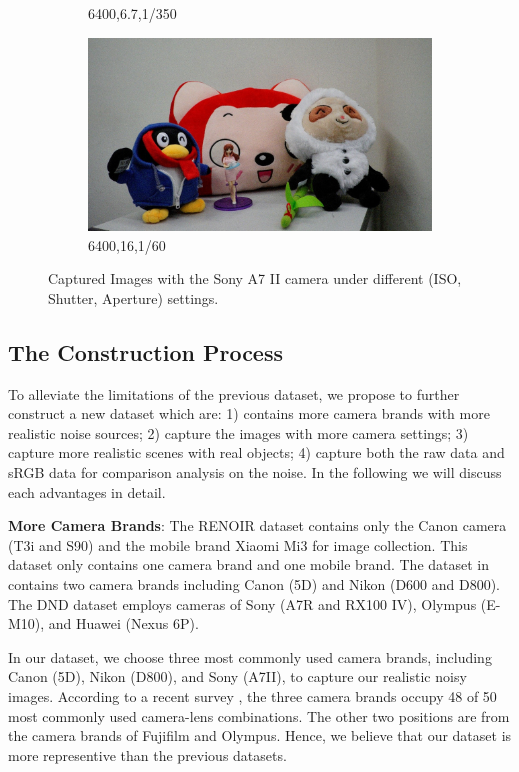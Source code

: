 \begin{figure}
\begin{subfigure}[t]{0.32\textwidth}
		\caption{6400,6.7,1/350}
    \end{subfigure}
    \hfill
    \begin{subfigure}[t]{0.32\textwidth}
        \centering
        \includegraphics[width=1\textwidth]{images/dataset/6400_16_1-60.jpg}
		\caption{6400,16,1/60}
    \end{subfigure}
    \caption{Captured Images with the Sony A7 II camera under different (ISO, Shutter, Aperture) settings.}
    \label{fig6-1}
\end{figure}


\subsection{The Construction Process}

To alleviate the limitations of the previous dataset, we propose to further construct a new dataset which are: 1) contains more camera brands with more realistic noise sources;  2) capture the images with more camera settings; 3) capture more realistic scenes with real objects; 4) capture both the raw data and sRGB data for comparison analysis on the noise. In the following we will discuss each advantages in detail.

\textbf{More Camera Brands}: The RENOIR dataset \cite{RENOIR2014} contains only the Canon camera (T3i and S90) and the mobile brand Xiaomi Mi3 for image collection. This dataset only contains one camera brand and one mobile brand. The dataset in \cite{crosschannel2016} contains two camera brands including Canon (5D) and Nikon (D600 and D800). The DND dataset \cite{dnd2017} employs cameras of Sony (A7R and RX100 IV),  Olympus (E-M10), and Huawei (Nexus 6P).

In our dataset, we choose three most commonly used camera brands, including Canon (5D), Nikon (D800), and Sony (A7II), to capture our realistic noisy images. According to a recent survey \cite{commoncamera}, the three camera brands occupy 48 of 50 most commonly used camera-lens combinations. The other two positions are from the camera brands of Fujifilm and Olympus. Hence, we believe that our dataset is more representive than the previous datasets.

